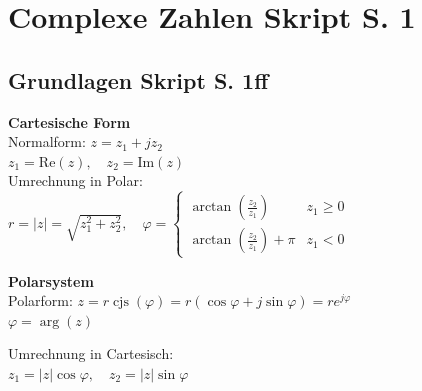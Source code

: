 \newcommand{\titleinfo}{Complexe Zahlen, Fourierreihen - Formelsammlung}
\newcommand{\authorinfo}{F. Braun, L. Schmid, U. Giger, R. Koller, E. Ammann, S.
Arnold, C.Gwerder, S.K\"orner}
\newcommand{\versioninfo}{$Revision: 878 $ - powered by \LaTeX}


\newcommand{\verweis}[2]{\small{(siehe auch \ref{#1}, #2 (S. \pageref{#1}))}}

\newcommand{\skriptsection}[2]{\section{#1 {\tiny Skript S. #2}}}
\newcommand{\skriptsubsection}[2]{\subsection{#1 {\tiny Skript S. #2}}}
\newcommand{\skriptsubsubsection}[2]{\subsubsection{#1 {\tiny Skript S. #2}}}

\DeclareMathOperator{\cjs}{cjs}
\DeclareMathOperator{\Ln}{Ln}



\setlength{\parindent}{0pt}

\skriptsection{Complexe Zahlen}{1}
\skriptsubsection{Grundlagen}{1ff}
\begin{minipage}[t]{9.4cm}
	\textbf{Cartesische Form}\\
	Normalform: $z = z_1 +j z_2$\\
	$z_1 = \text{Re}(z), \quad z_2 = \text{Im}(z)$\\
	Umrechnung in Polar:\\
	$r = |z| = \sqrt{z_1^2 + z_2^2}, \quad 
	\varphi = 	\begin{cases} 
                	\arctan(\frac{z_2}{z_1}) &z_1 \geq 0\\
                	\arctan(\frac{z_2}{z_1}) + \pi &z_1 < 0
    			\end{cases}$
\end{minipage}
\begin{minipage}[t]{9.4cm}
	\textbf{Polarsystem}\\
	Polarform: 
	$z = r \cjs(\varphi) = r(\cos{\varphi} + j\sin{\varphi}) = r e^{j \varphi}$\\
	$\varphi = \arg(z)$

	Umrechnung in Cartesisch:\\
	$z_1 = |z| \cos{\varphi}, \quad z_2 = |z| \sin{\varphi}$
\end{minipage}

